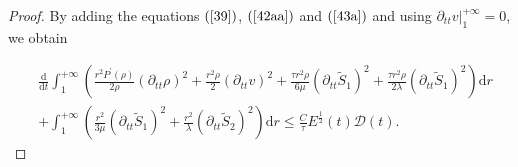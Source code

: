 \documentclass[10pt,reqno]{amsart}
\numberwithin{equation}{section}
\begin{document}
\begin{proof}
		By adding the equations $(\ref{39})$, $(\ref{42aa})$ and $(\ref{43a})$ and using $\partial_{tt}v\big|_{1}^{+\infty}=0$, we obtain
		
		\begin{equation}\label{42a}
			\begin{aligned}
				&\frac{\mathrm{d}}{\mathrm{d} t}\int_{1}^{+\infty}
				\left(\frac{r^2 P^{\prime}(\rho)}{2\rho} (\partial_{tt}\rho)^2
				+\frac{r^2\rho}{2}(\partial_{tt}v)^2
				+\frac{\tau r^2 \rho}{6\mu} (\partial_{tt}\tilde{S}_1)^2 +\frac{\tau r^2 \rho}{2\lambda}  (\partial_{tt}\tilde{S}_1)^2 \right)\mathrm{d}r\\
				&+\int_{1}^{+\infty} \left(\frac{r^2}{3 \mu}(\partial_{tt}\tilde{S}_1)^2
				+\frac{r^2}{\lambda}(\partial_{tt}\tilde{S}_2)^2\right)\mathrm{d}r \le \frac{C}{\tau} E^{\frac{1}{2}}(t) \mathcal{D}(t)
				.
			\end{aligned}
		\end{equation}
		
		
		

\end{proof}
\end{document}
